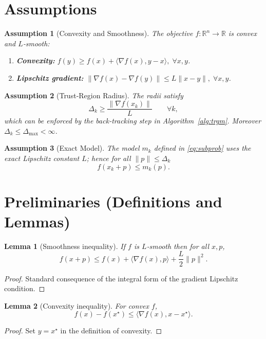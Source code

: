 \documentclass{article}
\newtheorem{lemma}{Lemma}
\newtheorem{assumption}{Assumption}
\begin{document}
\section*{Assumptions}
\begin{assumption}[Convexity and Smoothness]\label{ass:convexsmooth}
The objective $f:\mathbb{R}^n\to\mathbb{R}$ is convex and $L$‑smooth:
\begin{enumerate}
\item \textbf{Convexity:} $f(y)\ge f(x)+\langle\nabla f(x),y-x\rangle,\;\forall x,y$.
\item \textbf{Lipschitz gradient:} $\|\nabla f(x)-\nabla f(y)\|\le L\|x-y\|,\;\forall x,y$.
\end{enumerate}
\end{assumption}
\begin{assumption}[Trust‑Region Radius]\label{ass:radius}
The radii satisfy 
\[
\Delta_k\ge \frac{\|\nabla f(x_k)\|}{L}\qquad\forall k,
\]
which can be enforced by the back‑tracking step in Algorithm~\ref{alg:trgm}. Moreover $\Delta_k\le\Delta_{\max}<\infty$.
\end{assumption}
\begin{assumption}[Exact Model]\label{ass:model}
The model $m_k$ defined in \eqref{eq:subprob} uses the exact Lipschitz constant $L$; hence for all $\|p\|\le\Delta_k$
\[
f(x_k+p)\le m_k(p).
\]
\end{assumption}

\section*{Preliminaries (Definitions and Lemmas)}
\begin{lemma}[Smoothness inequality]\label{lem:smooth}
If $f$ is $L$‑smooth then for all $x,p$,
\[
f(x+p)\le f(x)+\langle\nabla f(x),p\rangle+\frac{L}{2}\|p\|^{2}.
\]
\end{lemma}
\begin{proof}
Standard consequence of the integral form of the gradient Lipschitz condition. \qedhere
\end{proof}

\begin{lemma}[Convexity inequality]\label{lem:convex}
For convex $f$,
\[
f(x)-f(x^\star)\le\langle\nabla f(x),x-x^\star\rangle .
\]
\end{lemma}
\begin{proof}
Set $y=x^\star$ in the definition of convexity. \qedhere
\end{proof}
\end{document}
